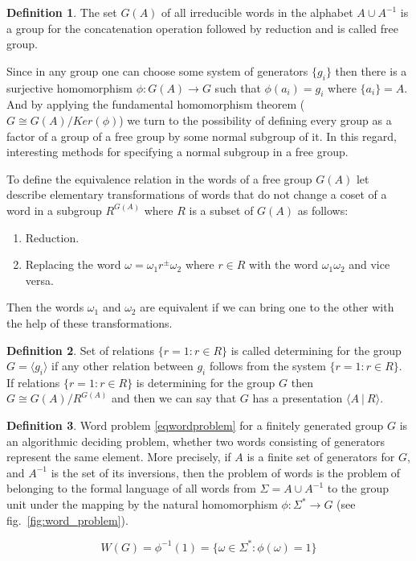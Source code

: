 \documentclass[conference]{IEEEtran}
\theoremstyle{definition}
\newtheorem{defn}{Definition}[section]
\begin{document}
\begin{defn}
The set $G(A)$ of all irreducible words in the alphabet $A \cup A^{-1}$
is a group for the concatenation operation followed by reduction and is called free group.
\end{defn}

Since in any group one can choose some system of generators $\{ g_i \}$ then there
is a surjective homomorphism $\phi: G(A) \to G$ such that $\phi(a_i) = g_i$
where $\{a_i\} = A$. And by applying the fundamental homomorphism theorem
($G \cong G(A)/Ker(\phi)$) we turn to the possibility of defining every group
as a factor of a group of a free group by some normal subgroup of it.
In this regard, interesting methods for specifying a normal subgroup in a free group.

To define the equivalence relation in the words of a free group $G(A)$
let describe elementary transformations of words that do not change
a coset of a word in a subgroup $R^{G(A)}$ where $R$ is a subset of $G(A)$ as follows:
\begin{enumerate}
\item Reduction.
\item Replacing the word $\omega = \omega_1 r^{\pm} \omega_2$ where $r \in R$ with the word $\omega_1 \omega_2$ and vice versa.
\end{enumerate}
Then the words $\omega_1$ and $\omega_2$ are equivalent if we can bring one to
the other with the help of these transformations.

\begin{defn}
Set of relations $\{ r=1: r \in R \}$ is called determining for the group
$G= \langle g_i \rangle$ if any other relation between
$g_i$ follows from the system $\{ r=1 : r \in R \}$. If relations
$\{ r=1 : r \in R \}$ is determining for the group $G$ then $G \cong G(A)/R^{G(A)}$
and then we can say that $G$ has a presentation $\langle A ~|~ R \rangle$.
\end{defn}

\begin{defn}
Word problem \eqref{eqwordproblem} for a finitely generated group  $G$ is an algorithmic deciding problem,
whether two words consisting of generators represent the same element.
More precisely, if $ A $ is a finite set of generators for $G$, and $A^{-1}$
is the set of its inversions, then the problem of words is the problem of belonging
to the formal language of all words from $\Sigma = A \cup A ^{-1}$
to the group unit under the mapping by the natural homomorphism $ \phi: \Sigma ^ * \to G $ (see fig.~\ref{fig:word_problem}).
\end{defn}
\begin{equation}
    W (G) = \phi ^ {- 1} (1) = \{ \omega \in \Sigma ^ *: \phi (\omega) = 1 \} \label{eqwordproblem}
\end{equation}
\end{document}
